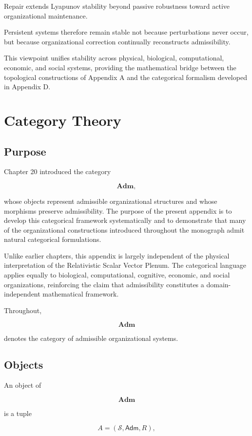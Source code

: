 \documentclass[11pt,oneside]{book}
\numberwithin{equation}{chapter}
\theoremstyle{definition}
\theoremstyle{plain}
\newcommand{\Adm}{\mathsf{Adm}}
\begin{document}
Repair extends Lyapunov stability beyond passive robustness toward active
organizational maintenance.

Persistent systems therefore remain stable not because perturbations
never occur, but because organizational correction continually
reconstructs admissibility.

This viewpoint unifies stability across physical, biological,
computational, economic, and social systems, providing the mathematical
bridge between the topological constructions of Appendix A and the
categorical formalism developed in Appendix D.

\chapter{Category Theory}

\section{Purpose}

Chapter 20 introduced the category

\[
\mathbf{Adm},
\]

whose objects represent admissible organizational structures and whose
morphisms preserve admissibility. The purpose of the present appendix is
to develop this categorical framework systematically and to demonstrate
that many of the organizational constructions introduced throughout the
monograph admit natural categorical formulations.

Unlike earlier chapters, this appendix is largely independent of the
physical interpretation of the Relativistic Scalar Vector Plenum. The
categorical language applies equally to biological, computational,
cognitive, economic, and social organizations, reinforcing the claim that
admissibility constitutes a domain-independent mathematical framework.

Throughout,

\[
\mathbf{Adm}
\]

denotes the category of admissible organizational systems.

\section{Objects}

An object of

\[
\mathbf{Adm}
\]

is a tuple

\[
A
=
(\mathcal S,\Adm,R),
\]
\end{document}
